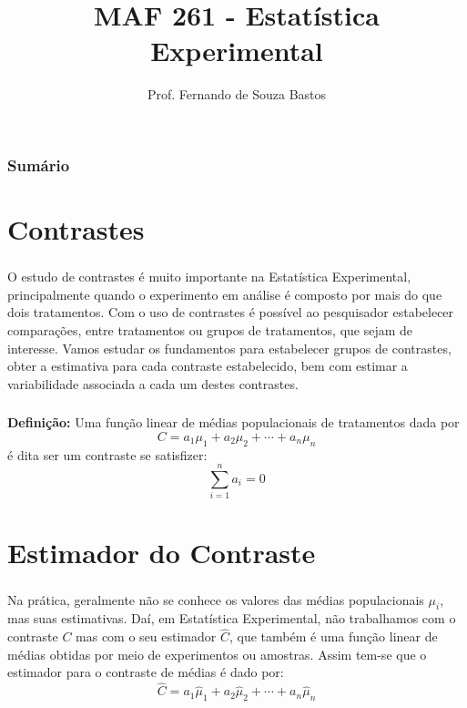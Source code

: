 \documentclass[14pt,aspectratio=1610]{beamer}
\title{MAF 261 - Estatística Experimental}
\author{Prof. Fernando de Souza Bastos}
\institute{Instituto de Ciências Exatas e Tecnológicas\texorpdfstring{\\ Universidade Federal de Viçosa}{}\texorpdfstring{\\ Campus UFV - Florestal}{}}
\date[\today]{}
\begin{document}


\frame{\titlepage}

\begin{frame}{}
\frametitle{\bf Sumário}
\tableofcontents
\end{frame}

\section{Contrastes}
\begin{frame}{}
\frametitle{}
\begin{block}{}
\justifying
O estudo de contrastes é muito importante na Estatística Experimental, principalmente quando o experimento em análise é composto por mais do que dois tratamentos. Com o uso de contrastes é possível ao pesquisador estabelecer comparações, entre tratamentos ou grupos de tratamentos, que sejam de interesse. Vamos estudar os fundamentos para estabelecer grupos de contrastes, obter a estimativa para cada contraste estabelecido, bem com estimar a variabilidade associada a cada um destes contrastes. 
\end{block}
\end{frame}

\begin{frame}{}
\frametitle{}
\begin{block}{}
\justifying
 {\bf Definição:} Uma função linear de médias populacionais de tratamentos dada por $$C=a_{1}\mu_{1}+a_{2}\mu_{2}+\cdots+a_{n}\mu_{n}$$ é dita ser um contraste se satisfizer:
$${\displaystyle \sum_{i=1}^{n}a_{i}=0}$$ 
\end{block}
\end{frame}

\section{Estimador do Contraste}
\begin{frame}{}
\frametitle{}
\begin{block}{}
\justifying
Na prática, geralmente não se conhece os valores das médias populacionais $\mu_{i}$,
mas suas estimativas. Daí, em Estatística Experimental, não trabalhamos com o contraste
$C$ mas com o seu estimador $\hat{C}$, que também é uma função linear de médias obtidas por meio de experimentos ou amostras. Assim tem-se que o estimador para o contraste de
médias é dado por: 
$$\hat{C}=a_{1}\hat{\mu}_{1}+a_{2}\hat{\mu}_{2}+\cdots+a_{n}\hat{\mu}_{n}$$
\end{block}
\end{frame}
\end{document}
